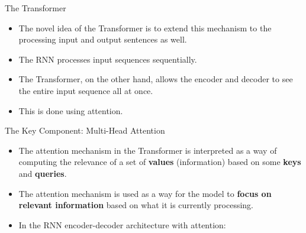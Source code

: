 \documentclass[handout]{beamer}
\begin{document}
\begin{frame}{The Transformer}
\begin{scriptsize}
\begin{itemize}
 \item The novel idea of the Transformer is to extend this mechanism to the processing input and output sentences as well.
 \item The RNN processes input sequences sequentially. 
 \item The Transformer, on the other hand, allows the encoder and decoder to see the entire input sequence all at once.
 \item This is done using attention.
\end{itemize}



\end{scriptsize}

\end{frame}




\begin{frame}{The Key Component: Multi-Head Attention}
\begin{scriptsize}
\begin{itemize}
 \item The attention mechanism in the Transformer is interpreted as a way of computing the relevance of a set of \textbf{values} (information) based on some \textbf{keys} and \textbf{queries}. 
 
 \item The attention mechanism is used as a way for the model to \textbf{focus on relevant information} based on what it is currently processing.
 
 \item In the RNN encoder-decoder architecture with attention:
 

 \begin{enumerate}

 \end{enumerate}

 
\end{itemize}



\end{scriptsize}

\end{frame}
\end{document}
